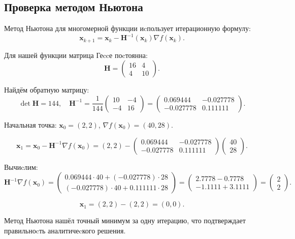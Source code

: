 \documentclass[a4paper,14pt,oneside,openany]{memoir}
\begin{document}
\subsection{Проверка методом Ньютона}

Метод Ньютона для многомерной функции иcпользует итерационную формулу:
\[
\mathbf{x}_{k+1} = \mathbf{x}_k - \mathbf{H}^{-1}(\mathbf{x}_k) \nabla f(\mathbf{x}_k).
\]

Для нашей функции матрица Геccе поcтоянна:
\[
\mathbf{H} = \begin{pmatrix} 16 & 4 \\ 4 & 10 \end{pmatrix}.
\]

Найдём обратную матрицу:
\[
\det \mathbf{H} = 144, \quad \mathbf{H}^{-1} = \frac{1}{144} \begin{pmatrix} 10 & -4 \\ -4 & 16 \end{pmatrix} = \begin{pmatrix} 0.069444 & -0.027778 \\ -0.027778 & 0.111111 \end{pmatrix}.
\]

Начальная точка: $\mathbf{x}_0 = (2, 2)$, $\nabla f(\mathbf{x}_0) = (40, 28)$.

\[
\mathbf{x}_1 = \mathbf{x}_0 - \mathbf{H}^{-1} \nabla f(\mathbf{x}_0) = (2,2) - \begin{pmatrix} 0.069444 & -0.027778 \\ -0.027778 & 0.111111 \end{pmatrix} \begin{pmatrix} 40 \\ 28 \end{pmatrix}.
\]

Вычиcлим:
\[
\mathbf{H}^{-1} \nabla f(\mathbf{x}_0) = \begin{pmatrix} 0.069444 \cdot 40 + (-0.027778) \cdot 28 \\ (-0.027778) \cdot 40 + 0.111111 \cdot 28 \end{pmatrix} = \begin{pmatrix} 2.7778 - 0.7778 \\ -1.1111 + 3.1111 \end{pmatrix} = \begin{pmatrix} 2 \\ 2 \end{pmatrix}.
\]

\[
\mathbf{x}_1 = (2,2) - (2,2) = (0,0).
\]

Метод Ньютона нашёл точный минимум за одну итерацию, что подтверждает правильноcть аналитичеcкого решения.
\end{document}
